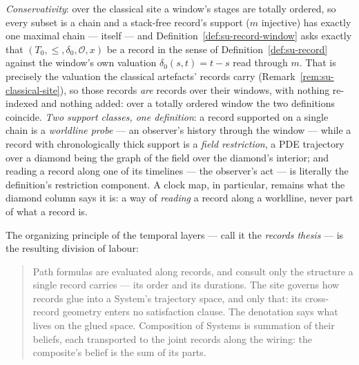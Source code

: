 \emph{Conservativity}: over the classical site a window's stages are
totally ordered, so every subset is a chain and a stack-free
record's support ($m$ injective) has exactly one maximal chain ---
itself ---
and Definition~\ref{def:su-record-window} asks
exactly that $(T_0, \le, \delta_0, \mathcal{O}, x)$ be a record in
the sense of Definition~\ref{def:su-record} against the window's own
valuation $\delta_0(s,t) = t - s$ read through $m$. That is precisely the valuation
the classical artefacts' records carry
(Remark~\ref{rem:su-classical-site}), so those
records \emph{are} records over their windows, with nothing
re-indexed and nothing added: over a totally ordered window the two
definitions coincide. \emph{Two support classes,
one definition}: a record supported on a single chain is a
\emph{worldline probe} --- an observer's history through the window
--- while a record with chronologically thick support is a
\emph{field restriction}, a PDE trajectory over a diamond being the
graph of the field over the diamond's interior; and reading a record
along one of its timelines --- the observer's act --- is literally
the definition's restriction component. A clock map, in particular,
remains what the diamond column says it is: a way of \emph{reading}
a record along a worldline, never part of what a record is.

The organizing principle of the temporal layers --- call it the
\emph{records thesis} --- is the resulting division of labour:

\begin{quote}
Path formulas are evaluated along records, and consult only the
structure a single record carries --- its order and its durations.
The site governs how records glue into a System's trajectory space,
and only that: its cross-record geometry enters no satisfaction
clause. The denotation says what lives on the glued space.
Composition of Systems is summation of their beliefs, each
transported to the joint records along the wiring: the composite's
belief is the sum of its parts.
\end{quote}


